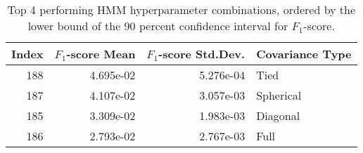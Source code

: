 \begin{table}
\caption{Top 4 performing HMM hyperparameter combinations, ordered by the lower bound of the 90 percent confidence interval for $F_1$-score.}
\label{tab:05_best_HMM_hpars}
\begin{tabular}{rrrl}
\toprule
Index & $F_1$-score Mean & $F_1$-score Std.Dev. & Covariance Type \\
\midrule
188 & 4.695e-02 & 5.276e-04 & Tied \\
187 & 4.107e-02 & 3.057e-03 & Spherical \\
185 & 3.309e-02 & 1.983e-03 & Diagonal \\
186 & 2.793e-02 & 2.767e-03 & Full \\
\bottomrule
\end{tabular}
\end{table}
